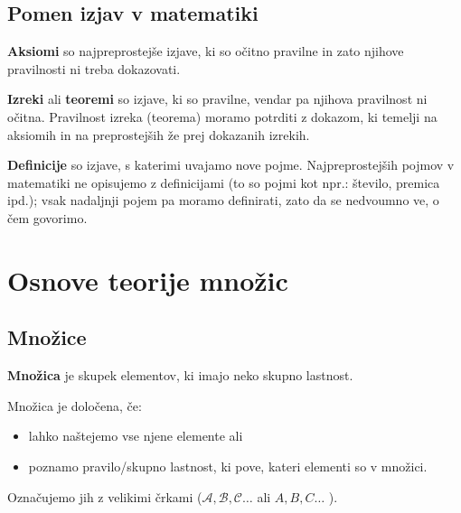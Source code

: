          

         
             \section{Pomen izjav v matematiki}
              
                \textbf{Aksiomi} so najpreprostejše izjave, ki so očitno pravilne in zato njihove 
                pravilnosti ni treba dokazovati.
             
              
                \textbf{Izreki} ali \textbf{teoremi} so izjave, ki so pravilne, vendar pa njihova 
                pravilnost ni očitna. 
                Pravilnost izreka (teorema) moramo potrditi z dokazom, ki temelji na aksiomih in na 
                preprostejših že prej dokazanih izrekih.
             
              
                \textbf{Definicije} so izjave, s katerimi uvajamo nove pojme. Najpreprostejših pojmov 
                v matematiki ne opisujemo z definicijami (to so pojmi kot npr.: število, premica ipd.); 
                vsak nadaljnji pojem pa moramo definirati, zato da se nedvoumno ve, o čem govorimo.
             

         
        
\chapter{Osnove teorije množic}


    
        \section{Množice}
        
            \textbf{Množica} je skupek elementov, ki imajo neko skupno lastnost.
        

            Množica je določena, če:
            \begin{itemize}
                \item lahko naštejemo vse njene elemente ali
                \item poznamo pravilo/skupno lastnost, ki pove, kateri elementi so v množici.
            \end{itemize}

            Označujemo jih z velikimi črkami ($\mathcal{A}, \mathcal{B}, \mathcal{C} \dots$ ali  
            $A, B, C \dots$ ). 
            \newline

